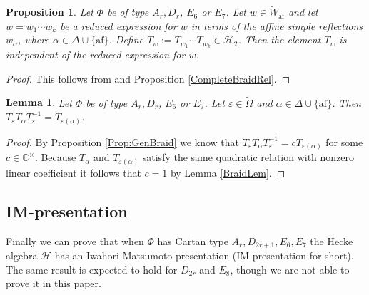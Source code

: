 \documentclass[10pt, letterpaper]{amsart}
\theoremstyle{plain}
\newtheorem{Prop}[equation]{Proposition}
\newtheorem{Lem}[equation]{Lemma}
\theoremstyle{definition}
\numberwithin{equation}{section}
\newcommand{\Omegat}{\widetilde{\Omega}}
\newcommand{\af}{\mathrm{af}}
\newcommand{\Hcal}{\mathcal{H}}
\begin{document}
	\begin{Prop}\label{P:TwDef}
		Let $\Phi$ be of type $A_r,D_r$, $E_{6}$ or $E_{7}$. Let $w\in\widetilde{W}_{\af}$ and let $w=w_{1}\cdots w_{k}$ be a reduced expression for $w$ in terms of the affine simple reflections $w_{\alpha}$, where $\alpha\in\Delta\cup\{\af\}$. Define $T_{w}:=T_{w_{1}}\cdots T_{w_{k}}\in \Hcal_{2}$. Then the element $T_{w}$ is independent of the reduced expression for $w$.
	\end{Prop}
	
	\begin{proof}
		This follows from \cite[Th\'{e}or\`{e}me 3]{T69} and Proposition \ref{CompleteBraidRel}.
	\end{proof}
	
	\begin{Lem}\label{OmegaAut}
		Let $\Phi$ be of type $A_r,D_r$, $E_{6}$ or $E_{7}$. Let $\varepsilon\in\Omegat$ and $\alpha\in\Delta\cup\{\af\}$. Then $T_{\varepsilon}T_{\alpha}T_{\varepsilon}^{-1}=T_{\varepsilon(\alpha)}$.
	\end{Lem}
	
	\begin{proof}
		By Proposition \ref{Prop:GenBraid} we know that $T_{\varepsilon}T_{\alpha}T_{\varepsilon}^{-1}=cT_{\varepsilon(\alpha)}$ for some $c\in\mathbb{C}^{\times}$. Because $T_{\alpha}$ and $T_{\varepsilon(\alpha)}$ satisfy the same quadratic relation with nonzero linear coefficient it follows that $c=1$ by Lemma \ref{BraidLem}.
	\end{proof}


    \subsection{IM-presentation}\label{SS:IMPres}
    
    Finally we can prove that when $\Phi$ has Cartan type $A_r,D_{2r+1},E_{6},E_{7}$ the Hecke algebra $\Hcal$ has an Iwahori-Matsumoto presentation (IM-presentation for short). The same result is expected to hold for $D_{2r}$ and $E_{8}$, though we are not able to prove it in this paper.
\end{document}
